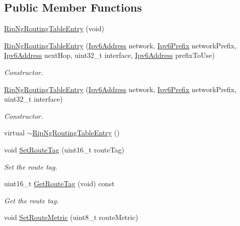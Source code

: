 \subsection*{Public Member Functions}
\begin{DoxyCompactItemize}
\item 
\hyperlink{classns3_1_1RipNgRoutingTableEntry_aa950bbb78a791694fcf5d0e5ca528eab}{Rip\+Ng\+Routing\+Table\+Entry} (void)
\item 
\hyperlink{classns3_1_1RipNgRoutingTableEntry_a444ecaa6fa4c1ef87253873c509192bb}{Rip\+Ng\+Routing\+Table\+Entry} (\hyperlink{classns3_1_1Ipv6Address}{Ipv6\+Address} network, \hyperlink{classns3_1_1Ipv6Prefix}{Ipv6\+Prefix} network\+Prefix, \hyperlink{classns3_1_1Ipv6Address}{Ipv6\+Address} next\+Hop, uint32\+\_\+t interface, \hyperlink{classns3_1_1Ipv6Address}{Ipv6\+Address} prefix\+To\+Use)
\begin{DoxyCompactList}\small\item\em Constructor. \end{DoxyCompactList}\item 
\hyperlink{classns3_1_1RipNgRoutingTableEntry_a342b095c5f5f02b03fc2719abfa67bc4}{Rip\+Ng\+Routing\+Table\+Entry} (\hyperlink{classns3_1_1Ipv6Address}{Ipv6\+Address} network, \hyperlink{classns3_1_1Ipv6Prefix}{Ipv6\+Prefix} network\+Prefix, uint32\+\_\+t interface)
\begin{DoxyCompactList}\small\item\em Constructor. \end{DoxyCompactList}\item 
virtual \hyperlink{classns3_1_1RipNgRoutingTableEntry_afa1c29580330584e08f1bfa4a6f4764a}{$\sim$\+Rip\+Ng\+Routing\+Table\+Entry} ()
\item 
void \hyperlink{classns3_1_1RipNgRoutingTableEntry_a8c82b81a6300a9a916d524b905bc7c53}{Set\+Route\+Tag} (uint16\+\_\+t route\+Tag)
\begin{DoxyCompactList}\small\item\em Set the route tag. \end{DoxyCompactList}\item 
uint16\+\_\+t \hyperlink{classns3_1_1RipNgRoutingTableEntry_a0fec29f1fb893e1befcd2647ca847b42}{Get\+Route\+Tag} (void) const 
\begin{DoxyCompactList}\small\item\em Get the route tag. \end{DoxyCompactList}\item 
void \hyperlink{classns3_1_1RipNgRoutingTableEntry_aa9cb450cdb14d6890ce3693ca0c15f88}{Set\+Route\+Metric} (uint8\+\_\+t route\+Metric)

\end{DoxyCompactItemize}
